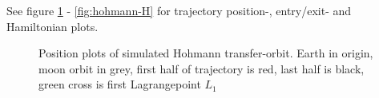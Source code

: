 See figure \ref{fig:hohmann-position} - \ref{fig:hohmann-H} for trajectory position-, entry/exit- and Hamiltonian plots.

\begin{figure}[ht!]
    \centering
        \caption{Position plots of simulated Hohmann transfer-orbit. Earth in origin, moon orbit in grey, first half of trajectory is red, last half is black, green cross is first Lagrangepoint $L_1$}
        \label{fig:hohmann-position}
\end{figure}

